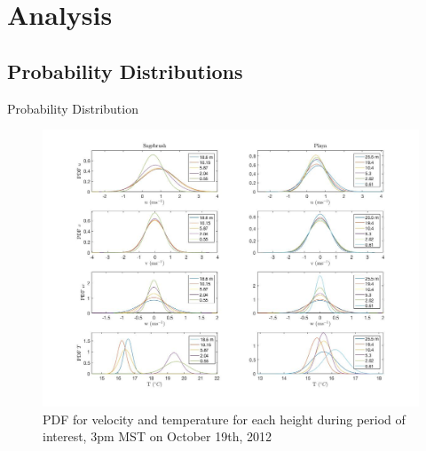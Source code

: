 \documentclass{beamer}
\begin{document}
%

\section{Analysis}
\subsection{Probability Distributions}
\begin{frame}{Probability Distribution}
\begin{figure}
\centering
\includegraphics[width=0.7\linewidth]{plots/pdf}
\caption{PDF for velocity and temperature for each height during period of interest, 3pm MST on October 19th, 2012}
\label{fig:pdf}
\end{figure}
\end{frame}
\end{document}
